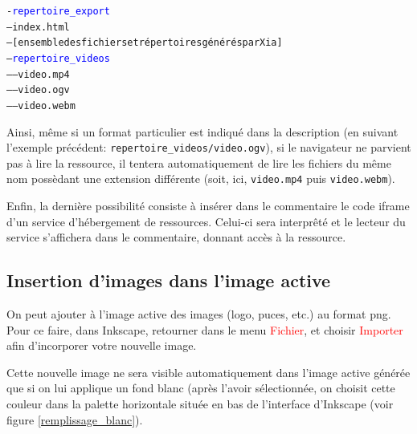 \documentclass[a4paper,12pt]{report}
\newcommand{\chemin}[1]{\textcolor{red}{#1}}
\begin{document}
\parbox{0.40\textwidth}
{
\begin{alltt}
 -\textcolor{blue}{repertoire\_export}\\
 ---index.html\\
 ---[ensemble des fichiers et répertoires générés par Xia]\\
 ---\textcolor{blue}{repertoire\_videos}\\
 -----video.mp4\\
 -----video.ogv\\
 -----video.webm\\
\end{alltt}
}


Ainsi, même si un format particulier est indiqué dans la description (en suivant l'exemple précédent: \verb|repertoire_videos/video.ogv|),
si le navigateur ne parvient pas à lire la ressource, il tentera automatiquement de lire les fichiers du même nom 
possèdant une extension différente (soit, ici, \verb|video.mp4| puis \verb|video.webm|).

Enfin, la dernière possibilité consiste à insérer dans le commentaire le code iframe d'un service d'hébergement de ressources.
Celui-ci sera interprêté et le lecteur du service s'affichera dans le commentaire, donnant accès à la ressource.

\subsection{Insertion d'images dans l'image active}\label{insertion_images}

On peut ajouter à l'image active des images (logo, puces, etc.) au format png.
Pour ce faire, dans Inkscape, retourner dans le menu \chemin{Fichier}, et choisir \chemin{Importer}
afin d'incorporer votre nouvelle image.

Cette nouvelle image ne sera visible automatiquement dans l'image active générée
que si on lui applique un fond blanc (après l'avoir sélectionnée, on choisit cette couleur dans la palette
horizontale située en bas de l'interface d'Inkscape (voir figure \ref{remplissage_blanc}).
\end{document}
